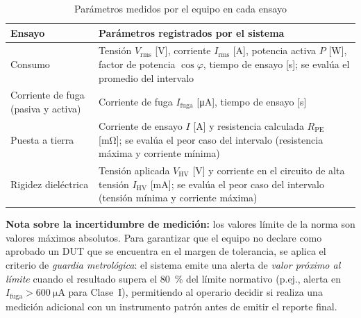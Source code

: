 \begin{table}[H]
\centering
\caption{Parámetros medidos por el equipo en cada ensayo}
\label{tab:parametros_medidos}
\renewcommand{\arraystretch}{1.35}
\begin{tabular}{@{} p{3.5cm} p{8.5cm} @{}}
\toprule
\textbf{Ensayo} & \textbf{Parámetros registrados por el sistema} \\
\midrule
Consumo
    & Tensión $V_{\text{rms}}$ [\si{\volt}], corriente $I_{\text{rms}}$
      [\si{\ampere}], potencia activa $P$ [\si{\watt}], factor de potencia
      $\cos\varphi$, tiempo de ensayo [\si{\second}]; se evalúa el promedio
      del intervalo \\
\addlinespace
Corriente de fuga (pasiva y activa)
    & Corriente de fuga $I_{\text{fuga}}$ [\si{\micro\ampere}],
      tiempo de ensayo [\si{\second}] \\
\addlinespace
Puesta a tierra
    & Corriente de ensayo $I$ [\si{\ampere}] y resistencia calculada
      $R_{\text{PE}}$ [\si{\milli\ohm}]; se evalúa el peor caso del
      intervalo (resistencia máxima y corriente mínima) \\
\addlinespace
Rigidez dieléctrica
    & Tensión aplicada $V_{\text{HV}}$ [\si{\volt}] y corriente en el
      circuito de alta tensión $I_{\text{HV}}$ [\si{\milli\ampere}]; se
      evalúa el peor caso del intervalo (tensión mínima y corriente máxima) \\
\bottomrule
\end{tabular}
\end{table}

\noindent\textbf{Nota sobre la incertidumbre de medición:}
los valores límite de la norma son valores máximos absolutos.
Para garantizar que el equipo no declare como aprobado un DUT
que se encuentra en el margen de tolerancia, se aplica el
criterio de \emph{guardia metrológica}: el sistema emite una
alerta de \emph{valor próximo al límite} cuando el resultado
supera el \SI{80}{\percent} del límite normativo
(p.ej., alerta en $I_{\text{fuga}} > \SI{600}{\micro\ampere}$ para Clase~I),
permitiendo al operario decidir si realiza una medición adicional
con un instrumento patrón antes de emitir el reporte final.
